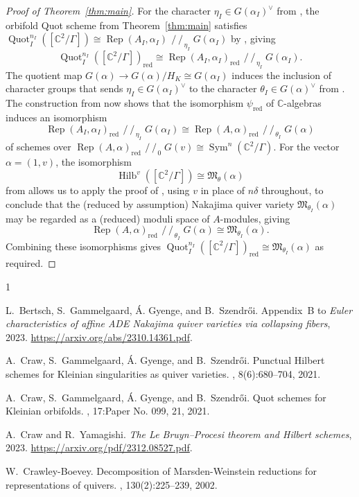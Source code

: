 \documentclass[11pt,reqno]{amsart}
\numberwithin{equation}{section}
\theoremstyle{definition}
\newcommand{\CC}{\ensuremath{\mathbb{C}}}
\newcommand{\git}{\ensuremath{\operatorname{\!/\!\!/\!}}}
\newcommand{\Hilb}{\operatorname{Hilb}}
\newcommand{\Quot}{\operatorname{Quot}}
\newcommand{\Rep}{\operatorname{Rep}}
\newcommand{\Sym}{\operatorname{Sym}}
\newcommand{\QuotI}[1][ ]{\Quot_I^{#1}}
\newcommand{\QuotInI}{\QuotI[n_I]}
\begin{document}
  \begin{proof}[Proof of Theorem~\ref{thm:main}]
  For the character $\eta_I\in G(\alpha_I)^\vee$ from \cite[(4.2)]{CGGS2}, the orbifold Quot scheme from Theorem~\ref{thm:main} satisfies $\QuotInI ([\mathbb{C}^2/\Gamma]) \cong \Rep(A_I,\alpha_I)\git_{\eta_I} G(\alpha_I)$ by \cite[Proposition~4.2]{CGGS2}, giving 
 \[
 \QuotInI ([\mathbb{C}^2/\Gamma])_{\mathrm{red}} \cong \Rep(A_I,\alpha_I)_{\mathrm{red}}\git_{\eta_I} G(\alpha_I).
 \]
The quotient map $G(\alpha)\to G(\alpha)/H_K\cong G(\alpha_I)$ induces the inclusion of character groups that sends $\eta_I\in G(\alpha_I)^\vee$ to the character $\theta_I\in G(\alpha)^\vee$ from \cite[(5.1)]{CGGS2}. The construction from \cite[Section~5.2]{CY23} now shows that the isomorphism $\psi_{\mathrm{red}}$ of $\CC$-algebras induces an isomorphism
\[
\Rep(A_I,\alpha_I)_{\mathrm{red}}\git_{\eta_I} G(\alpha_I)\cong \Rep(A,\alpha)_{\mathrm{red}}\git_{\theta_I} G(\alpha)
 \]
of schemes over $\Rep(A,\alpha)_{\mathrm{red}}\git_0 G(v)\cong\Sym^n(\mathbb{C}^2/\Gamma)$. For the vector $\alpha=(1,v)$, the isomorphism \[
\Hilb^v([\mathbb{C}^2/\Gamma])\cong \mathfrak{M}_{\theta}(\alpha)
\]
from \cite[Proposition~5.2]{CGGS2} allows us to apply the proof of \cite[Lemma~3.1]{CGGS1}, using $v$ in place of $n\delta$ throughout, to conclude that the (reduced by assumption) Nakajima quiver variety $\mathfrak{M}_{\theta_I}(\alpha)$ may be regarded as a (reduced) moduli space of $A$-modules, giving 
\[
\Rep(A,\alpha)_{\mathrm{red}}\git_{\theta_I} G(\alpha)\cong \mathfrak{M}_{\theta_I}(\alpha).
\]
Combining these isomorphisms gives $ \QuotInI ([\mathbb{C}^2/\Gamma])_{\mathrm{red}} \cong\mathfrak{M}_{\theta_I}(\alpha)$ as required.
\end{proof}
 


 \small{
\begin{thebibliography}{1}

L.~Bertsch, S.~Gammelgaard, \'{A}. Gyenge, and B.~Szendr\H{o}i.
\newblock Appendix~{B} to \emph{Euler characteristics of affine ADE Nakajima
  quiver varieties via collapsing fibers}, 2023.
\newblock \url{https://arxiv.org/abs/2310.14361.pdf}.

A.~Craw, S.~Gammelgaard, \'A. Gyenge, and B.~Szendr\H{o}i.
\newblock Punctual {H}ilbert schemes for {K}leinian singularities as quiver
  varieties.
, 8(6):680--704, 2021.

A.~Craw, S.~Gammelgaard, \'{A}. Gyenge, and B.~Szendr\H{o}i.
\newblock Quot schemes for {K}leinian orbifolds.
, 17:Paper No.
  099, 21, 2021.

A.~Craw and R.~Yamagishi.
\newblock \emph{{The Le Bruyn--Procesi theorem and Hilbert schemes}}, 2023.
\newblock \url{https://arxiv.org/pdf/2312.08527.pdf}.

W.~Crawley-Boevey.
\newblock Decomposition of {M}arsden-{W}einstein reductions for representations
  of quivers.
, 130(2):225--239, 2002.

\end{thebibliography}
}
\end{document}
